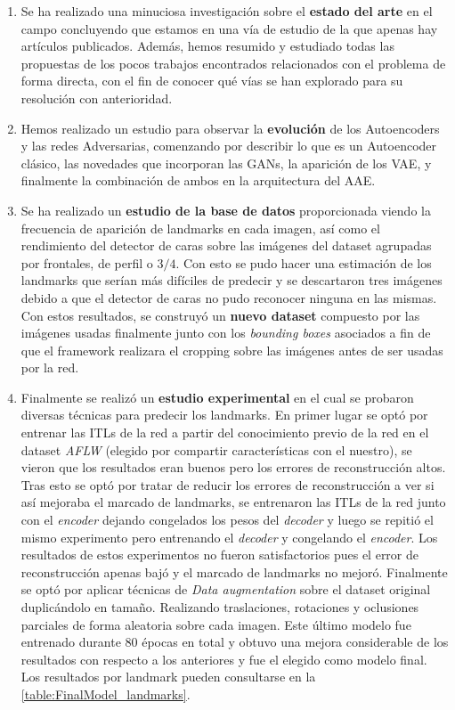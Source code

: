 \begin{enumerate}
    \item Se ha realizado una minuciosa investigación sobre el \textbf{estado del arte} en el campo concluyendo que estamos en una vía de estudio de la que apenas hay artículos publicados. Además, hemos resumido y estudiado todas las propuestas de los pocos trabajos encontrados relacionados con el problema de forma directa, con el fin de conocer qué vías se han explorado para su resolución con anterioridad.
    \item Hemos realizado un estudio para observar la \textbf{evolución} de los Autoencoders y las redes Adversarias, comenzando por describir lo que es un Autoencoder clásico, las novedades que incorporan las GANs, la aparición de los VAE, y finalmente la combinación de ambos en la arquitectura del AAE.
    \item Se ha realizado un \textbf{estudio de la base de datos} proporcionada viendo la frecuencia de aparición de landmarks en cada imagen, así como el rendimiento del detector de caras sobre las imágenes del dataset agrupadas por frontales, de perfil o $3/4$. Con esto se pudo hacer una estimación de los landmarks que serían más difíciles de predecir y se descartaron tres imágenes debido a que el detector de caras no pudo reconocer ninguna en las mismas. Con estos resultados, se construyó un \textbf{nuevo dataset} compuesto por las imágenes usadas finalmente junto con los \textit{bounding boxes} asociados a fin de que el framework realizara el cropping sobre las imágenes antes de ser usadas por la red.
    \item Finalmente se realizó un \textbf{estudio experimental} en el cual se probaron diversas técnicas para predecir los landmarks. En primer lugar se optó por entrenar las ITLs de la red a partir del conocimiento previo de la red en el dataset \textit{AFLW} (elegido por compartir características con el nuestro), se vieron que los resultados eran buenos pero los errores de reconstrucción altos. Tras esto se optó por tratar de reducir los errores de reconstrucción a ver si así mejoraba el marcado de landmarks, se entrenaron las ITLs de la red junto con el \textit{encoder} dejando congelados los pesos del \textit{decoder} y luego se repitió el mismo experimento pero entrenando el \textit{decoder} y congelando el \textit{encoder}. Los resultados de estos experimentos no fueron satisfactorios pues el error de reconstrucción apenas bajó y el marcado de landmarks no mejoró. Finalmente se optó por aplicar técnicas de \textit{Data augmentation} sobre el dataset original duplicándolo en tamaño. Realizando traslaciones, rotaciones y oclusiones parciales de forma aleatoria sobre cada imagen. Este último modelo fue entrenado durante $80$ épocas en total y obtuvo una mejora considerable de los resultados con respecto a los anteriores y fue el elegido como modelo final. Los resultados por landmark pueden consultarse en la \autoref{table:FinalModel_landmarks}.
\end{enumerate}


